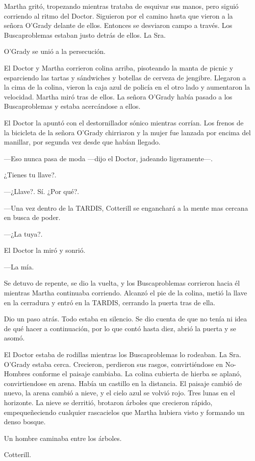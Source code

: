 Martha gritó, tropezando mientras trataba de esquivar sus manos, pero siguió corriendo al ritmo del Doctor. Siguieron por el camino hasta que vieron a la señora O'Grady delante de ellos. Entonces se desviaron campo a través. Los Buscaproblemas estaban justo detrás de ellos. La Sra.

O'Grady se unió a la persecución.

El Doctor y Martha corrieron colina arriba, pisoteando la manta de picnic y esparciendo las tartas y sándwiches y botellas de cerveza de jengibre. Llegaron a la cima de la colina, vieron la caja azul de policía en el otro lado y aumentaron la velocidad. Martha miró tras de ellos. La señora O'Grady había pasado a los Buscaproblemas y estaba acercándose a ellos.

El Doctor la apuntó con el destornillador sónico mientras corrían. Los frenos de la bicicleta de la señora O'Grady chirriaron y la mujer fue lanzada por encima del manillar, por segunda vez desde que habían llegado.

---Eso nunca pasa de moda ---dijo el Doctor, jadeando ligeramente---.

¿Tienes tu llave?.

---¿Llave?. Sí. ¿Por qué?.

---Una vez dentro de la TARDIS, Cotterill se enganchará a la mente mas cercana en busca de poder.

---¿La tuya?.

El Doctor la miró y sonrió.

---La mía.

Se detuvo de repente, se dio la vuelta, y los Buscaproblemas corrieron hacia él mientras Martha continuaba corriendo. Alcanzó el pie de la colina, metió la llave en la cerradura y entró en la TARDIS, cerrando la puerta tras de ella.

Dio un paso atrás. Todo estaba en silencio. Se dio cuenta de que no tenía ni idea de qué hacer a continuación, por lo que contó hasta diez, abrió la puerta y se asomó.

El Doctor estaba de rodillas mientras los Buscaproblemas lo rodeaban. La Sra. O'Grady estaba cerca. Crecieron, perdieron sus rasgos, convirtiéndose en No-Hombres conforme el paisaje cambiaba. La colina cubierta de hierba se aplanó, convirtiendose en arena. Había un castillo en la distancia. El paisaje cambió de nuevo, la arena cambió a nieve, y el cielo azul se volvió rojo. Tres lunas en el horizonte. La nieve se derritió, brotaron árboles que crecieron rápido, empequeñeciendo cualquier rascacielos que Martha hubiera visto y formando un denso bosque.

Un hombre caminaba entre los árboles.

Cotterill.

